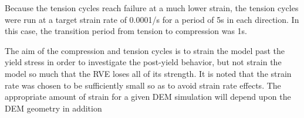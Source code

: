 Because the tension cycles reach failure at a much lower strain, the
tension cycles were run at a target strain rate of 0.0001/s for a
period of 5s in each direction. In this case, the transition period
from tension to compression was 1s.

The aim of the compression and tension cycles is to strain the model
past the yield stress in order to investigate the post-yield behavior,
but not strain the model so much that the RVE loses all of its strength.
It is noted that the strain rate was chosen to be sufficiently small
so as to avoid strain rate effects. The appropriate amount of strain
for a given DEM simulation will depend upon the DEM geometry in addition
